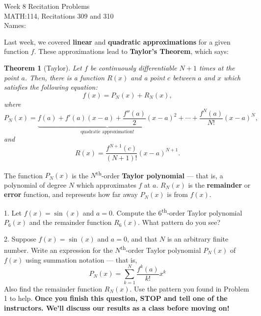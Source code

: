 \documentclass[11pt]{article}
\newtheorem*{theorem*}{Theorem}
\begin{document}
	\thispagestyle{empty}
	{
		\centering
		\huge{Week 8 Recitation Problems} \\
		\Large{MATH:114, Recitations 309 and 310} \\[2em]
	}
	\normalsize{Names:} \hrulefill
	\vspace{3em}
	
	Last week, we covered \textbf{linear} and \textbf{quadratic approximations} for a given function $f$. These approximations lead to \textbf{Taylor's Theorem}, which says:
	
	\begin{theorem*}[Taylor]
		Let $f$ be continuously differentiable $N+1$ times at the point $a$. Then, there is a function $R(x)$ and a point $c$ between $a$ and $x$ which satisfies the following equation: $$ f(x) = P_N(x) + R_N(x),$$ where $$P_N(x) = \underbrace{f(a) + f'(a)(x-a) + \frac{f''(a)}{2}(x-a)^2}_{\text{quadratic approximation!}} + \cdots + \frac{f^N(a)}{N!}(x-a)^N, $$ and $$ R(x) = \frac{f^{N+1}(c)}{(N+1)!}(x-a)^{N+1}.$$
	\end{theorem*}
	
	The function $P_N(x)$ is the $N$\textsuperscript{th}-order \textbf{Taylor polynomial} --- that is, a polynomial of degree $N$ which approximates $f$ at $a$. $R_N(x)$ is the \textbf{remainder} or \textbf{error} function, and represents how far away $P_N(x)$ is from $f(x)$.
	
	
	
	
	\vspace{3em}
	1. Let $f(x) = \sin(x)$ and $a=0$. Compute the $6$\textsuperscript{th}-order Taylor polynomial $P_6(x)$ and the remainder function $R_6(x)$. What pattern do you see?
	
	\vspace{0.15\textheight}
	2. Suppose $f(x) = \sin(x)$ and $a=0$, and that $N$ is an arbitrary finite number. Write an expression for the $N$\textsuperscript{th}-order Taylor polynomial $P_N(x)$ of $f(x)$ using summation notation --- that is, $$ P_N(x) = \sum_{k=1}^N \frac{f^k(a)}{k!}x^k$$ Also find the remainder function $R_N(x)$. Use the pattern you found in Problem 1 to help. \textbf{Once you finish this question, STOP and tell one of the instructors. We'll discuss our results as a class before moving on!}
	
\end{document}

